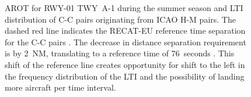 \begin{figure}[h]
    \centering
    
    
    \caption[AROT for RWY~01 and LTI of C-C pairs from ICAO H-M pairs]{AROT for RWY-01 TWY~A-1 during the summer season and LTI distribution of C-C pairs originating from ICAO H-M pairs. The dashed red line indicates the RECAT-EU reference time separation for the C-C pairs \protect{}. The decrease in distance separation requirement is by 2~NM, translating to a reference time of 76~seconds \protect{}. This shift of the reference line creates opportunity for shift to the left in the frequency distribution of the LTI and the possibility of landing more aircraft per time interval.}\label{fig:best_CC_from_HM_pairs_time_sep}
\end{figure}

